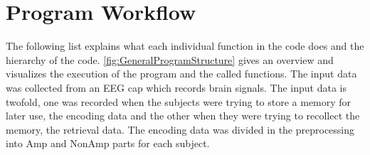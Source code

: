 \documentclass[12pt, a4paper]{article}
\begin{document}
\section{Program Workflow}

The following list explains what each individual function in the code does and the hierarchy of the code.
\cref{fig:GeneralProgramStructure} gives an overview and visualizes the execution of the program and the called functions.
The input data was collected from an EEG cap which records brain signals.
The input data is twofold, one was recorded when the subjects were trying to store a memory for later use, the encoding data and the other when they were trying to recollect the memory, the retrieval data.
The encoding data was divided in the preprocessing into Amp and NonAmp parts for each subject.%
\end{document}
